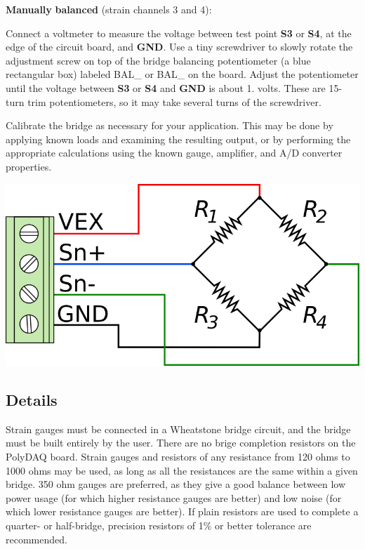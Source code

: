 \begin{DoxyEnumerate}
\begin{DoxyItemize}
\begin{DoxyItemize}
\end{DoxyItemize}
\item {\bfseries Manually} {\bfseries balanced} (strain channels 3 and 4)\-:
\begin{DoxyItemize}
\item Connect a voltmeter to measure the voltage between test point {\bfseries S3} or {\bfseries S4}, at the edge of the circuit board, and {\bfseries G\-N\-D}. Use a tiny screwdriver to slowly rotate the adjustment screw on top of the bridge balancing potentiometer (a blue rectangular box) labeled {\ttfamily B\-A\-L\-\_} or {\ttfamily B\-A\-L\-\_} on the board. Adjust the potentiometer until the voltage between {\bfseries S3} or {\bfseries S4} and {\bfseries G\-N\-D} is about 1. volts. These are 15-\/turn trim potentiometers, so it may take several turns of the screwdriver.
\end{DoxyItemize}
\end{DoxyItemize}
\item Calibrate the bridge as necessary for your application. This may be done by applying known loads and examining the resulting output, or by performing the appropriate calculations using the known gauge, amplifier, and A/\-D converter properties.
\end{DoxyEnumerate}

 
\begin{DoxyImageNoCaption}
  \mbox{\includegraphics{strain_bridge_connections.png}}
\end{DoxyImageNoCaption}
\hypertarget{pd_sensors_sg_details}{}\subsection{Details}\label{pd_sensors_sg_details}
Strain gauges must be connected in a Wheatstone bridge circuit, and the bridge must be built entirely by the user. There are no brige completion resistors on the Poly\-D\-A\-Q board. Strain gauges and resistors of any resistance from 120 ohms to 1000 ohms may be used, as long as all the resistances are the same within a given bridge. 350 ohm gauges are preferred, as they give a good balance between low power usage (for which higher resistance gauges are better) and low noise (for which lower resistance gauges are better). If plain resistors are used to complete a quarter-\/ or half-\/bridge, precision resistors of 1\% or better tolerance are recommended.

